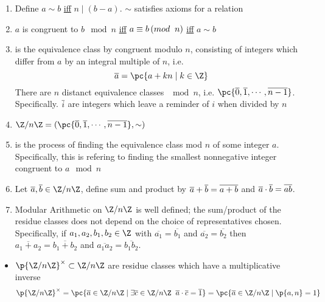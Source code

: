 \documentclass[11pt]{article}
\begin{document}
\begin{definition*}
    \begin{enumerate}
        \item {} Define $a\sim b$ \underline{iff} $n \mid (b-a)$. $\sim$ satisfies axioms for a relation
        \item {} $a$ is congruent to $b \mod n$ \underline{iff} $a \equiv b \left(mod \;\; n \right)$ \underline{iff} $a\sim b$
        \item {} is the equivalence class by congruent modulo $n$, consisting of integers which differ from $a$ by an integral multiple of $n$, i.e. 
        \[
            \overline{a} = \pc{a+kn \mid k\in \Z}        
        \]
        There are $n$ distanct equivalence classes $\mod n$, i.e. $\pc{\overline{0}, \overline{1}, \cdots, \overline{n-1}}$. Specifically. $\overline{i}$ are integers which leave a reminder of $i$ when divided by $n$
        \item {} $\integermodn = (\pc{\overline{0}, \overline{1}, \cdots, \overline{n-1}}, \sim)$
        \item {} is the process of finding the equivalence class mod $n$ of some integer $a$. Specifically, this is refering to finding the smallest nonnegative integer congruent to $a\mod n$
        \item {} Let $\oa,\ob \in \integermodn$, define sum and product by $\overline{a} + \overline{b} = \overline{a+b}$ and $\overline{a} \cdot \overline{b} = \overline{ab}$.
        \item {} Modular Arithmetic on $\integermodn$ is well defined; the sum/product of the residue classes does not depend on the choice of representatives chosen. Specifically, if $a_1,a_2,b_1,b_2\in \Z$ with $\overline{a_1} = \overline{b_1}$ and $\overline{a_2} = \overline{b_2}$ then $\overline{a_1 + a_2} = \overline{b_1 + b_2}$ and $\overline{a_1 a_2} = \overline{b_1 b_2}$.
    \end{enumerate}
    \begin{itemize}
        \item $\p{\integermodn}^{\times} \subset \integermodn$ are residue classes which have a multiplicative inverse
        \[
            \p{\integermodn}^{\times} = \pc{
                \oa \in \integermodn \mid
                \exists \oc \in \integermodn \;\; \oa \cdot \oc = \overline{1}
            } = \pc{
                \oa \in \integermodn \mid \p{a,n} = 1
}\]
\end{itemize}
\end{definition*}
\end{document}
